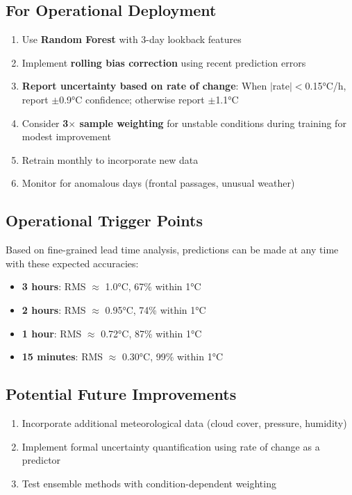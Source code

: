 \documentclass[11pt,letterpaper]{article}
\begin{document}
\subsection{For Operational Deployment}
\begin{enumerate}[noitemsep]
    \item Use \textbf{Random Forest} with 3-day lookback features
    \item Implement \textbf{rolling bias correction} using recent prediction errors
    \item \textbf{Report uncertainty based on rate of change}: When $|$rate$|<$0.15°C/h, report $\pm$0.9°C confidence; otherwise report $\pm$1.1°C
    \item Consider \textbf{3$\times$ sample weighting} for unstable conditions during training for modest improvement
    \item Retrain monthly to incorporate new data
    \item Monitor for anomalous days (frontal passages, unusual weather)
\end{enumerate}

\subsection{Operational Trigger Points}
Based on fine-grained lead time analysis, predictions can be made at any time with these expected accuracies:
\begin{itemize}[noitemsep]
    \item \textbf{3 hours}: RMS $\approx$ 1.0°C, 67\% within 1°C
    \item \textbf{2 hours}: RMS $\approx$ 0.95°C, 74\% within 1°C
    \item \textbf{1 hour}: RMS $\approx$ 0.72°C, 87\% within 1°C
    \item \textbf{15 minutes}: RMS $\approx$ 0.30°C, 99\% within 1°C
\end{itemize}

\subsection{Potential Future Improvements}
\begin{enumerate}[noitemsep]
    \item Incorporate additional meteorological data (cloud cover, pressure, humidity)
    \item Implement formal uncertainty quantification using rate of change as a predictor
    \item Test ensemble methods with condition-dependent weighting
\end{enumerate}
\end{document}
